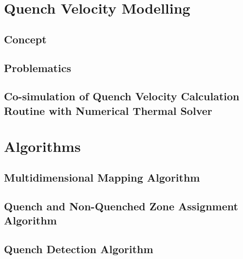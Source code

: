 \documentclass[11pt,a4paper]{report}
\begin{document}
\clearpage
\chapter{Quench Velocity Modelling}
\label{chapter:quench_velocity_modelling}

\section{Concept}
\label{section:quench_velocity_concept}


\section{Problematics}
\label{section:quench_velocity_problematics}


\section{Co-simulation of Quench Velocity Calculation Routine with Numerical Thermal Solver}
\label{section:quench_velocity_cosimulation}


\clearpage
\chapter{Algorithms}
\label{chapter:algorithms}


\section{Multidimensional Mapping Algorithm}
\label{section:multidimensional_mapping_algorithm}


\section{Quench and Non-Quenched Zone Assignment Algorithm}
\label{section:node_searching_algorithm}


\section{Quench Detection Algorithm}
\label{section:quench_detection_algorithm}

\end{document}
